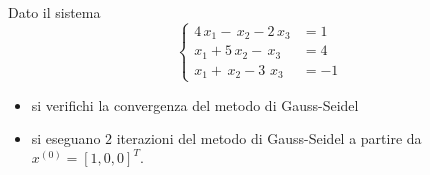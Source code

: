 Dato il sistema
\[ \left \{
\begin{array}{ll}
4\,  x_1-\, x_2-2\,x_3 &=1\\
x_1+5\, x_2 -\, x_3&=4 \\
x_1+\,x_2 - 3\, \,x_3&=-1
\end{array}
\right.
\]
\begin{itemize}
\item si verifichi la convergenza del metodo di Gauss-Seidel
\item si eseguano $2$ iterazioni del metodo di Gauss-Seidel a partire da $x^{(0)}=[1, 0, 0]^T.$
\end{itemize}